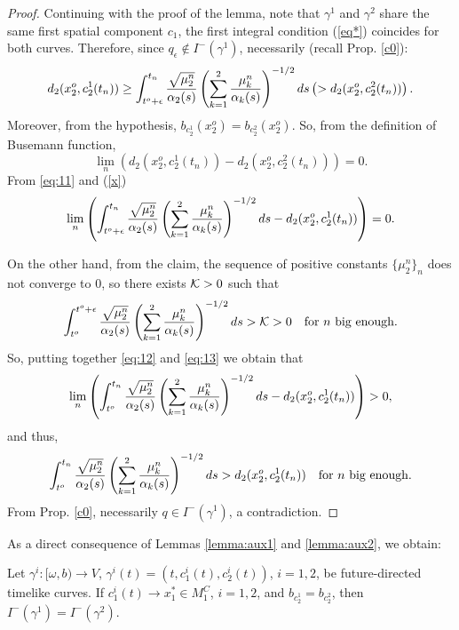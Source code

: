 \begin{proof}


    \smallskip


  Continuing with the proof of the lemma, note that $\gamma^1$ and $\gamma^2$ share the same first spatial component $c_1$, the first integral condition (\ref{eq*}) coincides for both curves. Therefore, since $q_\epsilon\not\in I^-(\gamma^1)$, necessarily (recall Prop. \ref{c0}):
    \begin{equation}
      \label{eq:11}
d_2(x^o_2,c^1_2(t_n))\geq \int_{t^o+\epsilon}^{t_n} \frac{\sqrt{\mu^n_{2}}}{\alpha_{2}(s)}\left(\sum_{k=1}^{2} \frac{\mu^n_{k}}{\alpha_{k}(s)} \right)^{-1/2}ds\left(>
             d_{2}(x^o_{2},c^2_{2}(t_n))\right).
    \end{equation}
    Moreover, from the hypothesis, $b_{c_2^1}(x_2^o)=b_{c_2^2}(x_2^o)$. So, from the definition of Busemann function,
    \begin{equation}\label{x}
    \lim_{n}\left(d_2(x_2^o,c_2^1(t_n))-d_2(x_2^o,c_2^2(t_n))\right)=0.
    \end{equation}
    From \eqref{eq:11} and (\ref{x})
    \begin{equation}
      \label{eq:12}
\lim_n \left(\int_{t^o+\epsilon}^{t_n} \frac{\sqrt{\mu^n_{2}}}{\alpha_{2}(s)}\left(\sum_{k=1}^{2} \frac{\mu^n_{k}}{\alpha_{k}(s)} \right)^{-1/2}ds-d_2(x_2^o,c_2^1(t_n))\right)=0.
    \end{equation}

On the other hand, from the claim, the sequence of positive constants $\{\mu_2^n\}_n$ does not converge to $0$, so there exists ${\cal K}>0$ such that
   \begin{equation}
     \label{eq:13}
     \int_{t^o}^{t^o+\epsilon} \frac{\sqrt{\mu_2^n}}{\alpha_{2}(s)}\left(\sum_{k=1}^{2} \frac{\mu_k^n}{\alpha_{k}(s)} \right)^{-1/2}ds>{\cal K}>0\quad\hbox{for $n$ big enough.}
   \end{equation}
        So, putting together \eqref{eq:12} and \eqref{eq:13} we obtain that
\[
\lim_n \left(\int_{t^o}^{t_n} \frac{\sqrt{\mu^n_{2}}}{\alpha_{2}(s)}\left(\sum_{k=1}^{2} \frac{\mu^n_{k}}{\alpha_{k}(s)} \right)^{-1/2}ds-d_2(x_2^o,c_2^1(t_n))\right)>0,
  \]
  and thus,
  \[
\int_{t^o}^{t_n} \frac{\sqrt{\mu^n_{2}}}{\alpha_{2}(s)}\left(\sum_{k=1}^{2} \frac{\mu^n_{k}}{\alpha_{k}(s)} \right)^{-1/2}ds>d_2(x_2^o,c_2^1(t_n))\quad\hbox{for $n$ big enough.}
    \]
    From Prop. \ref{c0}, necessarily $q\in I^-(\gamma^1)$, a contradiction.


\end{proof}
\noindent As a direct consequence of Lemmas \ref{lemma:aux1} and \ref{lemma:aux2}, we obtain:
\begin{prop}\label{samecondsamepast}
Let $\gamma^i:[\omega,b)\rightarrow V$, $\gamma^i(t)=(t,c_1^i(t),c_2^i(t))$, $i=1,2$, be future-directed timelike curves. If $c_1^i(t)\rightarrow x_1^*\in M_1^C$, $i=1,2$, and $b_{c_2^1}=b_{c_2^2}$, then $I^-(\gamma^1)=I^-(\gamma^2)$.
\end{prop}
